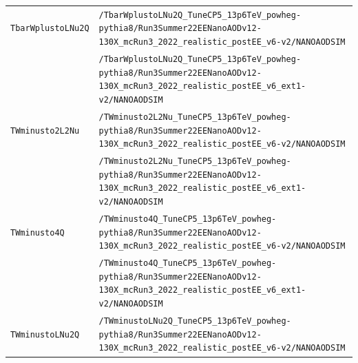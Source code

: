 \begin{longtable}{@{}>{\RaggedRight\arraybackslash}p{} >{\RaggedRight\arraybackslash}p{}@{}}
\addlinespace[2pt]
\texttt{TbarWplustoLNu2Q} & \texttt{/\allowbreak{}TbarWplustoLNu2Q\_\allowbreak{}TuneCP5\_\allowbreak{}13p6TeV\_\allowbreak{}powheg-\allowbreak{}pythia8/\allowbreak{}Run3Summer22EENanoAODv12-\allowbreak{}130X\_\allowbreak{}mcRun3\_\allowbreak{}2022\_\allowbreak{}realistic\_\allowbreak{}postEE\_\allowbreak{}v6-\allowbreak{}v2/\allowbreak{}NANOAODSIM} \\
 & \texttt{/\allowbreak{}TbarWplustoLNu2Q\_\allowbreak{}TuneCP5\_\allowbreak{}13p6TeV\_\allowbreak{}powheg-\allowbreak{}pythia8/\allowbreak{}Run3Summer22EENanoAODv12-\allowbreak{}130X\_\allowbreak{}mcRun3\_\allowbreak{}2022\_\allowbreak{}realistic\_\allowbreak{}postEE\_\allowbreak{}v6\_\allowbreak{}ext1-\allowbreak{}v2/\allowbreak{}NANOAODSIM} \\
\addlinespace[2pt]
\texttt{TWminusto2L2Nu} & \texttt{/\allowbreak{}TWminusto2L2Nu\_\allowbreak{}TuneCP5\_\allowbreak{}13p6TeV\_\allowbreak{}powheg-\allowbreak{}pythia8/\allowbreak{}Run3Summer22EENanoAODv12-\allowbreak{}130X\_\allowbreak{}mcRun3\_\allowbreak{}2022\_\allowbreak{}realistic\_\allowbreak{}postEE\_\allowbreak{}v6-\allowbreak{}v2/\allowbreak{}NANOAODSIM} \\
 & \texttt{/\allowbreak{}TWminusto2L2Nu\_\allowbreak{}TuneCP5\_\allowbreak{}13p6TeV\_\allowbreak{}powheg-\allowbreak{}pythia8/\allowbreak{}Run3Summer22EENanoAODv12-\allowbreak{}130X\_\allowbreak{}mcRun3\_\allowbreak{}2022\_\allowbreak{}realistic\_\allowbreak{}postEE\_\allowbreak{}v6\_\allowbreak{}ext1-\allowbreak{}v2/\allowbreak{}NANOAODSIM} \\
\addlinespace[2pt]
\texttt{TWminusto4Q} & \texttt{/\allowbreak{}TWminusto4Q\_\allowbreak{}TuneCP5\_\allowbreak{}13p6TeV\_\allowbreak{}powheg-\allowbreak{}pythia8/\allowbreak{}Run3Summer22EENanoAODv12-\allowbreak{}130X\_\allowbreak{}mcRun3\_\allowbreak{}2022\_\allowbreak{}realistic\_\allowbreak{}postEE\_\allowbreak{}v6-\allowbreak{}v2/\allowbreak{}NANOAODSIM} \\
 & \texttt{/\allowbreak{}TWminusto4Q\_\allowbreak{}TuneCP5\_\allowbreak{}13p6TeV\_\allowbreak{}powheg-\allowbreak{}pythia8/\allowbreak{}Run3Summer22EENanoAODv12-\allowbreak{}130X\_\allowbreak{}mcRun3\_\allowbreak{}2022\_\allowbreak{}realistic\_\allowbreak{}postEE\_\allowbreak{}v6\_\allowbreak{}ext1-\allowbreak{}v2/\allowbreak{}NANOAODSIM} \\
\addlinespace[2pt]
\texttt{TWminustoLNu2Q} & \texttt{/\allowbreak{}TWminustoLNu2Q\_\allowbreak{}TuneCP5\_\allowbreak{}13p6TeV\_\allowbreak{}powheg-\allowbreak{}pythia8/\allowbreak{}Run3Summer22EENanoAODv12-\allowbreak{}130X\_\allowbreak{}mcRun3\_\allowbreak{}2022\_\allowbreak{}realistic\_\allowbreak{}postEE\_\allowbreak{}v6-\allowbreak{}v2/\allowbreak{}NANOAODSIM} \\

\end{longtable}
